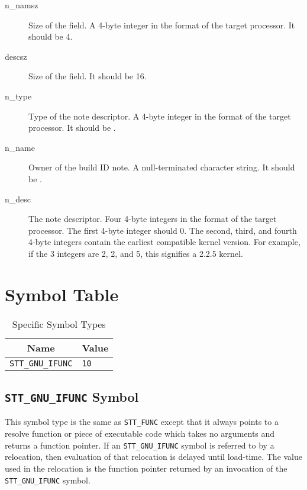 \begin{description}
 \item[n_namsz] Size of the  field.  A 4-byte integer in the
   format of the target processor.  It should be 4.
 \item[descsz] Size of the  field.  It should be 16.
 \item[n_type] Type of the note descriptor.  A 4-byte integer in the format
   of the target processor.  It should be .
 \item[n_name] Owner of the build ID note.  A null-terminated character
   string.  It should be .
 \item[n_desc] The note descriptor. Four 4-byte integers in the format of
   the target processor.  The first 4-byte integer should 0.  The second,
   third, and fourth 4-byte integers contain the earliest compatible
   kernel version.  For example, if the 3 integers are 2, 2, and 5, this
   signifies a 2.2.5 kernel.
\end{description}

\section{Symbol Table}

\begin{table}[H]
\Hrule
  \caption{\xOS Specific Symbol Types}
  \label{ifunc}
  \begin{center}
    \begin{tabular}[t]{l|l}
      \multicolumn{1}{c}{Name} & \multicolumn{1}{c}{Value} \\
      \hline
      \texttt{STT_GNU_IFUNC} & \texttt{10}
    \end{tabular}
  \end{center}
\Hrule
\end{table}

\subsection{\texttt{STT_GNU_IFUNC} Symbol}

This symbol type is the same as \texttt{STT_FUNC} except that it always
points to a resolve function or piece of executable code which takes
no arguments and returns a function pointer.  If an \texttt{STT_GNU_IFUNC}
symbol is referred to by a relocation, then evaluation of that relocation
is delayed until load-time.  The value used in the relocation is the
function pointer returned by an invocation of the \texttt{STT_GNU_IFUNC}
symbol.

